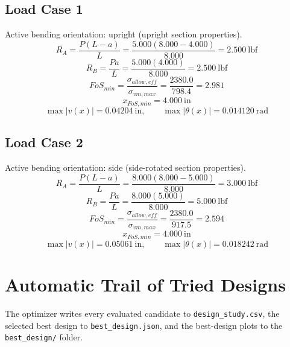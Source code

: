 \documentclass[11pt]{article}
\begin{document}
\subsection*{Load Case 1}
Active bending orientation: upright (upright section properties).
\[R_A = \frac{P(L-a)}{L} = \frac{5.000(8.000-4.000)}{8.000} = 2.500\ \mathrm{lbf}\]
\[R_B = \frac{Pa}{L} = \frac{5.000(4.000)}{8.000} = 2.500\ \mathrm{lbf}\]
\[FoS_{min} = \frac{\sigma_{allow,eff}}{\sigma_{vm,max}} = \frac{2380.0}{798.4} = 2.981\]
\[x_{FoS,min} = 4.000\ \mathrm{in}\]
\[\max |v(x)| = 0.04204\ \mathrm{in}, \qquad \max |\theta(x)| = 0.014120\ \mathrm{rad}\]
\subsection*{Load Case 2}
Active bending orientation: side (side-rotated section properties).
\[R_A = \frac{P(L-a)}{L} = \frac{8.000(8.000-5.000)}{8.000} = 3.000\ \mathrm{lbf}\]
\[R_B = \frac{Pa}{L} = \frac{8.000(5.000)}{8.000} = 5.000\ \mathrm{lbf}\]
\[FoS_{min} = \frac{\sigma_{allow,eff}}{\sigma_{vm,max}} = \frac{2380.0}{917.5} = 2.594\]
\[x_{FoS,min} = 4.000\ \mathrm{in}\]
\[\max |v(x)| = 0.05061\ \mathrm{in}, \qquad \max |\theta(x)| = 0.018242\ \mathrm{rad}\]

\section*{Automatic Trail of Tried Designs}
The optimizer writes every evaluated candidate to \texttt{design\_study.csv}, the selected best design to \texttt{best\_design.json}, and the best-design plots to the \texttt{best\_design/} folder.
\end{document}
